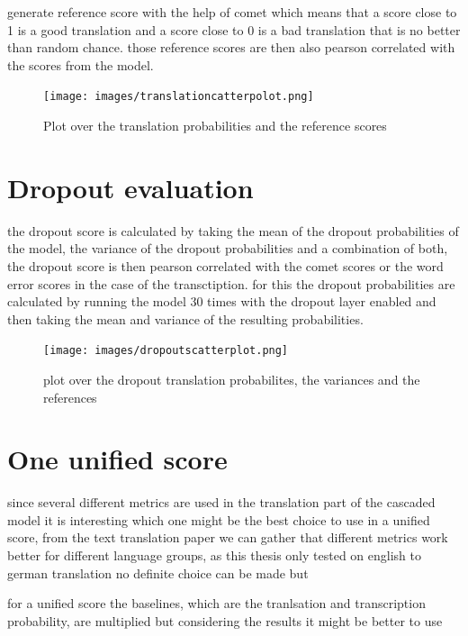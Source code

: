 generate reference score with the help of comet \cite{rei-etal-2020-comet} which means that a score close to 1 is a good translation and a score close to 0 is a bad translation that is no better than random chance.
those reference scores are then also pearson correlated with the scores from the model. 
\begin{figure}
    \centering
    \texttt{[image: images/translationcatterpolot.png]}
    \caption{Plot over the translation probabilities and the reference scores}
    \label{fig:translationeval scatter plot}
\end{figure}

\section{Dropout evaluation}
the dropout score is calculated by taking the mean of the dropout probabilities of the model, the variance of the dropout probabilities and a combination of both, the dropout score is then pearson correlated with the comet scores or the word error scores in the case of the transctiption. 
for this the dropout probabilities are calculated by running the model 30 times with the dropout layer enabled and then taking the mean and variance of the resulting probabilities. 

\begin{figure}
    \centering
    \texttt{[image: images/dropoutscatterplot.png]}
    \caption{plot over the dropout translation probabilites, the variances and the references}
    \label{fig:dropout scatter plot}
\end{figure}

\section{One unified score}
since several different metrics are used in the translation part of the cascaded model it is interesting which one might be the best choice to use in a unified score, from the text translation paper \cite{fomicheva2020unsupervised} we can gather that different metrics work better for different language groups, as this thesis only tested on english to german translation no definite choice can be made but

for a unified score the baselines, which are the tranlsation and transcription probability, are multiplied
but considering the results it might be better to use 

